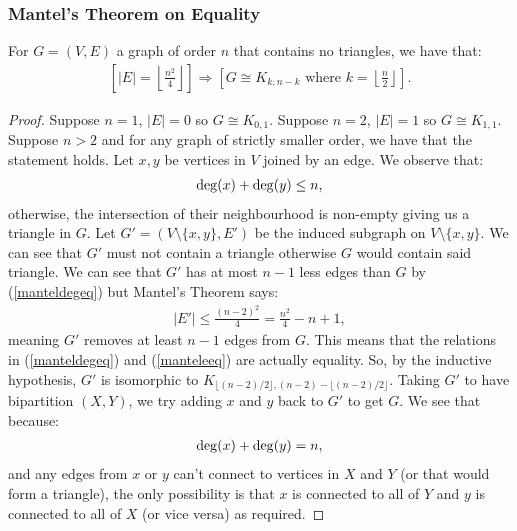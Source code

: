 \subsubsection{Mantel's Theorem on Equality}

For $G = (V, E)$ a graph of order $n$ that contains no triangles, we have that:
\begin{gather*}
    \left[ |E| = \left\lfloor \frac{n^2}{4} \right\rfloor \right]
    \Rightarrow
    \left[ G \cong K_{k, n - k} \text{ where } k = \left\lfloor \frac{n}{2} \right\rfloor \right].
\end{gather*}
\begin{proof}
    Suppose $n = 1$, $|E| = 0$ so $G \cong K_{0, 1}$.
    Suppose $n = 2$, $|E| = 1$ so $G \cong K_{1, 1}$.
    Suppose $n > 2$ and for any graph of strictly smaller order, we have that
    the statement holds. Let $x, y$ be vertices in $V$ joined by an edge. We
    observe that: \begin{gather} \label{manteldegeq}
        \operatorname{deg}(x) + \operatorname{deg}(y) \leq n,
    \end{gather} otherwise, the intersection of their neighbourhood is 
    non-empty giving us a triangle in $G$. Let $G' = (V \setminus \{x, y\}, E')$ 
    be the induced subgraph on $V \setminus \{x, y\}$. We can see that 
    $G'$ must not contain a triangle otherwise $G$ would contain said triangle.
    We can see that $G'$ has at most $n - 1$ less edges than $G$ by
    (\ref{manteldegeq}) but Mantel's Theorem says: 
    \begin{gather} \label{manteleeq} 
        |E'| \leq \frac{(n - 2)^2}{4} = \frac{n^2}{4} - n + 1,
    \end{gather} meaning $G'$ removes at least $n - 1$ edges from $G$.
    This means that the relations in (\ref{manteldegeq}) and (\ref{manteleeq}) 
    are actually equality. So, by the inductive hypothesis, $G'$ is isomorphic
    to $K_{\lfloor(n - 2)/2\rfloor, (n - 2) - \lfloor(n - 2)/2\rfloor}$. Taking 
    $G'$ to have bipartition $(X, Y)$, we try adding $x$ and $y$ back to $G'$ to 
    get $G$. We see that because: \begin{gather*}
        \operatorname{deg}(x) + \operatorname{deg}(y) = n,
    \end{gather*} and any edges from $x$ or $y$ can't connect to vertices
    in $X$ and $Y$ (or that would form a triangle), the only possibility is 
    that $x$ is connected to all of $Y$ and $y$ is connected to all of $X$ 
    (or vice versa) as required.
\end{proof}